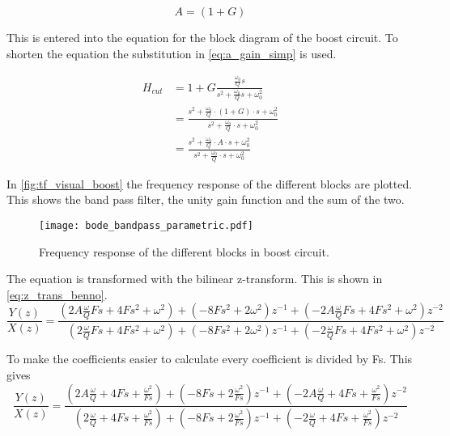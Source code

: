 \begin{equation}\label{eq:a_gain_simp}
A=(1+G)
\end{equation}

This is entered into the equation for the block diagram of the boost circuit.
To shorten the equation the substitution in \autoref{eq:a_gain_simp} is used.

\begin{equation}
\begin{split}
H_{cut} & = 1 + G\frac{\frac{\omega_0}{Q}s}{s^2+\frac{\omega_0}{Q}s+\omega_0^2}\\
&=\frac{s^2+\frac{\omega_0}{Q} \cdot(1+G) \cdot s + \omega_0^2}{s^2+\frac{\omega_0}{Q} \cdot s + \omega_0^2} \\
&=\frac{s^2+\frac{\omega_0}{Q} \cdot A \cdot s + \omega_0^2}{s^2+\frac{\omega_0}{Q} \cdot s + \omega_0^2}
\end{split}
\end{equation}
\startexplain
\stopexplain


In \autoref{fig:tf_visual_boost} the frequency response of the different blocks are plotted. This shows the band pass filter, the unity gain function and the sum of the two. 


\begin{figure}[htbp]
    \centering
    \texttt{[image: bode\_bandpass\_parametric.pdf]}
    \caption{Frequency response of the different blocks in boost circuit.}
    \label{fig:tf_visual_boost}
\end{figure}

The equation is transformed with the bilinear z-transform. This is shown in \autoref{eq:z_trans_benno}. 
\begin{equation}
	\frac{Y(z)}{X(z)} = \frac{ ( 2 A \frac{ \omega }{ Q }  Fs + 4 Fs^2 + \omega ^ 2) + ( -8 Fs ^ 2 + 2 \omega ^ 2 ) z ^ { -1 } + (- 2 A \frac{ \omega } { Q }  Fs + 4 Fs^2 + \omega ^ {2}) z ^ { - 2 }}{( 2 \frac{ \omega }{ Q }  Fs + 4 Fs^2 + \omega ^ 2)+ (- 8 Fs ^ 2 + 2 \omega ^ 2 ) z ^ { -1 } + (- 2 \frac{ \omega } { Q }  Fs + 4 Fs^2 + \omega ^ {2}) z ^ { - 2 } }
	\label{eq:z_trans_benno}
\end{equation}

To make the coefficients easier to calculate every coefficient is divided by Fs. This gives 
\begin{equation}\label{eq:tf_boost_para}
	\frac{Y(z)}{X(z)} = \frac{ ( 2 A \frac{ \omega }{ Q } + 4 Fs + \frac{\omega ^ 2}{Fs}) + ( -8 Fs + 2 \frac{\omega ^ 2}{Fs}) z ^ { -1 } + (- 2 A \frac{ \omega } { Q }  + 4 Fs + \frac{\omega ^ 2}{Fs}) z ^ { - 2 }}{( 2 \frac{ \omega }{ Q }  + 4 Fs + \frac{\omega ^ 2}{Fs})+ ( -8 Fs + 2 \frac{\omega ^ 2}{Fs}) z ^ { -1 } + ( -2 \frac{ \omega } { Q } + 4 Fs + \frac{\omega ^ 2}{Fs}) z ^ { - 2 } }
\end{equation}

